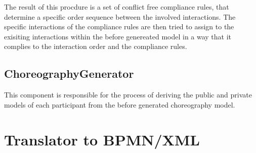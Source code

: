 The result of this procdure is a set of conflict free compliance rules, that determine a specific order sequence between the involved interactions.
The specific interactions of the compliance rules are then tried to assign to the exisiting interactions within the before genereated model in a way that it complies to the interaction order and the compliance rules.


\subsection{ChoreographyGenerator}
This component is responsible for the process of deriving the public and private models of each participant from the before generated choreography model.


\section{Translator to BPMN/XML}
